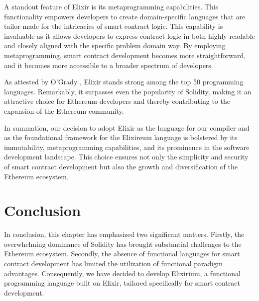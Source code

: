 A standout feature of Elixir is its metaprogramming capabilities. This functionality empowers developers to create domain-specific languages that are tailor-made for the intricacies of smart contract logic. This capability is invaluable as it allows developers to express contract logic in both highly readable and closely aligned with the specific problem domain way. By employing metaprogramming, smart contract development becomes more straightforward, and it becomes more accessible to a broader spectrum of developers.

As attested by O'Grady \cite{RedMonk}, Elixir stands strong among the top 50 programming languages. Remarkably, it surpasses even the popularity of Solidity, making it an attractive choice for Ethereum developers and thereby contributing to the expansion of the Ethereum community.

In summation, our decision to adopt Elixir as the language for our compiler and as the foundational framework for the Elixireum language is bolstered by its immutability, metaprogramming capabilities, and its prominence in the software development landscape. This choice ensures not only the simplicity and security of smart contract development but also the growth and diversification of the Ethereum ecosystem.

\section{Conclusion}
\label{sec:conc}

In conclusion, this chapter has emphasized two significant matters. Firstly, the overwhelming dominance of Solidity has brought substantial challenges to the Ethereum ecosystem. Secondly, the absence of functional languages for smart contract development has limited the utilization of functional paradigm advantages. Consequently, we have decided to develop Elixirium, a functional programming language built on Elixir, tailored specifically for smart contract development.
